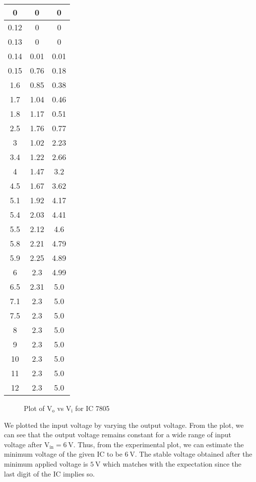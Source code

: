 \documentclass{scrartcl}
\begin{document}
\begin{longtable}{|c|c|c|}
        0         & 0         & 0         \\ \hline
        0.12      & 0         & 0         \\ \hline
        0.13      & 0         & 0         \\ \hline
        0.14      & 0.01      & 0.01      \\ \hline
        0.15      & 0.76      & 0.18      \\ \hline
        1.6       & 0.85      & 0.38      \\ \hline
        1.7       & 1.04      & 0.46      \\ \hline
        1.8       & 1.17      & 0.51      \\ \hline
        2.5       & 1.76      & 0.77      \\ \hline
        3         & 1.02      & 2.23      \\ \hline
        3.4       & 1.22      & 2.66      \\ \hline
        4         & 1.47      & 3.2       \\ \hline
        4.5       & 1.67      & 3.62      \\ \hline
        5.1       & 1.92      & 4.17      \\ \hline
        5.4       & 2.03      & 4.41      \\ \hline
        5.5       & 2.12      & 4.6       \\ \hline
        5.8       & 2.21      & 4.79      \\ \hline
        5.9       & 2.25      & 4.89      \\ \hline
        6         & 2.3       & 4.99      \\ \hline
        6.5       & 2.31      & 5.0         \\ \hline
        7.1       & 2.3       & 5.0        \\ \hline
        7.5       & 2.3       & 5.0         \\ \hline
        8         & 2.3       & 5.0         \\ \hline
        9         & 2.3       & 5.0         \\ \hline
        10        & 2.3       & 5.0         \\ \hline
        11        & 2.3       & 5.0         \\ \hline
        12        & 2.3       & 5.0         \\ \hline
        
        \end{longtable}
\begin{figure}[H]
        \centering
        
        \caption{Plot of $\mathrm{V_o}$ vs $\mathrm{V_i}$ for IC 7805}
\end{figure}
\noindent
We plotted the input voltage by varying the output voltage. From the plot, we can see that the output voltage remains constant for a wide range of input voltage after $\mathrm{V_{in}}=\SI{6}{\volt}$. Thus, from the experimental plot, we can estimate the minimum voltage of the given IC to be $\SI{6}{\volt}$. The stable voltage obtained after the minimum applied voltage is $5 \ \mathrm{V}$ which matches with the expectation since the last digit of the IC implies so.
\end{document}
